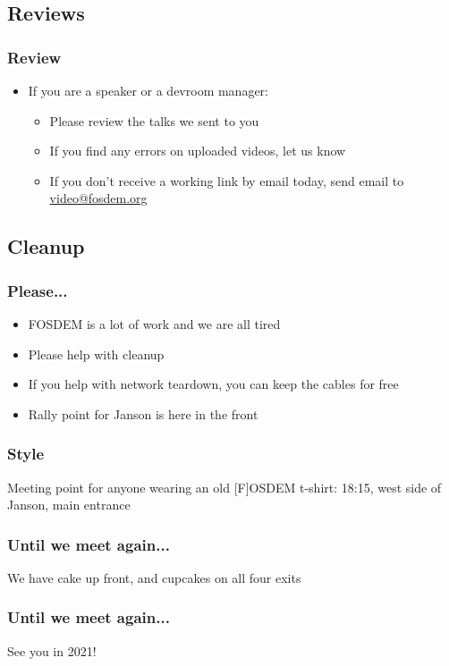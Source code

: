 \documentclass[aspectratio=169]{beamer}
\begin{document}
\subsection{Reviews}

\begin{frame}
	\frametitle{Review}
	\vfill
	\begin{itemize}
		\item If you are a speaker or a devroom manager:
		\begin{itemize}
			\item Please review the talks we sent to you
			\item If you find any errors on uploaded videos, let us know
			\item If you don't receive a working link by email today, send email to \url{video@fosdem.org}
		\end{itemize}
	\end{itemize}
	\vfill
\end{frame}

\subsection{Cleanup}

\begin{frame}
	\frametitle{Please...}
	\vfill
	\begin{itemize}
		\item FOSDEM is a lot of work and we are all tired
		\item Please help with cleanup
		\item If you help with network teardown, you can keep the cables for free
		\item Rally point for Janson is here in the front
	\end{itemize}
	\vfill
\end{frame}

\begin{frame}
	\frametitle{Style}
	\begin{center}
		\vfill
			Meeting point for anyone wearing an old [F]OSDEM t-shirt:
		\vfill
			18:15, west side of Janson, main entrance
		\vfill
	\end{center}
\end{frame}

\begin{frame}
	\frametitle{Until we meet again...}
	\vfill
	\begin{center}
		{\Huge We have cake up front, and cupcakes on all four exits}
	\end{center}
	\vfill
\end{frame}

\begin{frame}
	\frametitle{Until we meet again...}
	\vfill
	\begin{center}
		{\Huge See you in 2021!}
	\end{center}
	\vfill
\end{frame}
\end{document}
